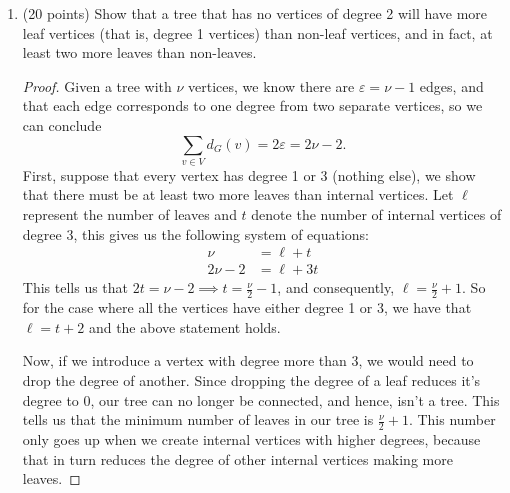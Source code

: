 \documentclass[11pt]{article}
\newcommand{\n}{\vspace{0.5cm}}
\begin{document}
\begin{enumerate}
\begin{proof}
\begin{minipage}{0.4\textwidth}
        \end{minipage} \n\\
        The path from \(x\) to \(y\) in \(T_{\min}\) requires us to first traverse edge with cost 5, then the edge with cost 6.  Our total cost for this path is \(5 + 6 = 11\).  But if we wanted to get from \(x\) to \(y\) in our original graph \(G\), we could simply take the edge of weight 8, this yields a lower cost than the path in our minimum-cost spanning tree.
      \end{proof}
      

    \item (20 points) Show that a tree that has no vertices of degree 2 will have more leaf vertices (that is, degree 1 vertices) than non-leaf vertices, and in fact, at least two more leaves than non-leaves.
      \begin{proof}
        Given a tree with \(\nu\) vertices, we know there are \(\varepsilon = \nu - 1\) edges, and that each edge corresponds to one degree from two separate vertices, so we can conclude 
        \[\sum_{v \in V} d_G(v) = 2\varepsilon = 2\nu - 2.\]
        First, suppose that every vertex has degree 1 or 3 (nothing else), we show that there must be at least two more leaves than internal vertices.  Let \(\ell\) represent the number of leaves and \(t\) denote the number of internal vertices of degree \(3\), this gives us the following system of equations:
        \begin{align*}
          \nu       &= \ell + t \\
          2\nu - 2 &= \ell + 3t
        \end{align*}
        This tells us that \(2t = \nu - 2 \implies t = \frac{\nu}{2} - 1\), and consequently, \(\ell = \frac{\nu}{2} + 1\).  So for the case where all the vertices have either degree 1 or 3, we have that \(\ell = t + 2\) and the above statement holds.

        Now, if we introduce a vertex with degree more than 3, we would need to drop the degree of another.  Since dropping the degree of a leaf reduces it's degree to 0, our tree can no longer be connected, and hence, isn't a tree.  This tells us that the minimum number of leaves in our tree is \(\frac{\nu}{2} + 1\).  This number only goes up when we create internal vertices with higher degrees, because that in turn reduces the degree of other internal vertices making more leaves.


\end{proof}
\end{enumerate}
\end{document}

